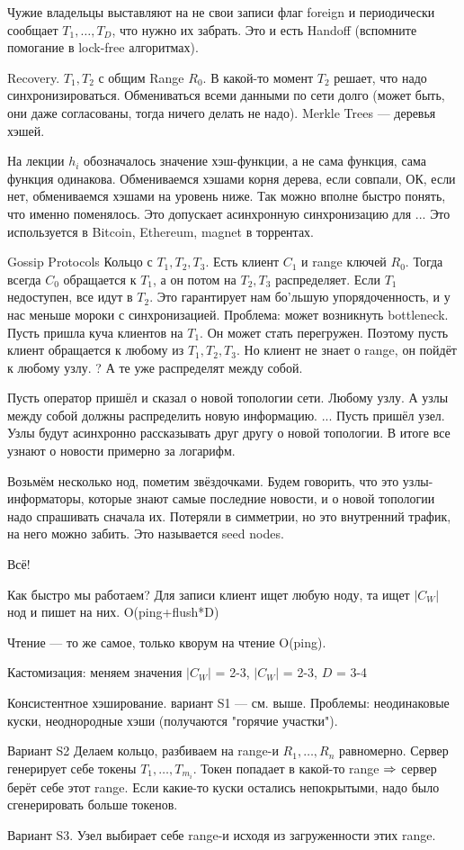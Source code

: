 Чужие владельцы выставляют на не свои записи флаг foreign и периодически сообщает $T_1, \dots, T_D$, что нужно их забрать. Это и есть Handoff (вспомните помогание в lock-free алгоритмах).

Recovery.
$T_1, T_2$ с общим Range $R_0$. В какой-то момент $T_2$ решает, что надо синхронизироваться. Обмениваться всеми данными по сети долго (может быть, они даже согласованы, тогда ничего делать не надо).
Merkle Trees --- деревья хэшей. 

На лекции $h_i$ обозначалось значение хэш-функции, а не сама функция, сама функция одинакова. Обмениваемся хэшами корня дерева, если совпали, ОК, если нет, обмениваемся хэшами на уровень ниже. Так можно вполне быстро понять, что именно поменялось.
Это допускает асинхронную синхронизацию для ...
Это используется в Bitcoin, Ethereum, magnet в торрентах.

Gossip Protocols
Кольцо с $T_1, T_2, T_3$. Есть клиент $C_1$ и range ключей $R_0$. Тогда всегда $C_0$ обращается к $T_1$, а он потом на $T_2, T_3$ распределяет. Если $T_1$ недоступен, все идут в $T_2$. Это гарантирует нам бо'льшую упорядоченность, и у нас меньше мороки с синхронизацией.
Проблема: может возникнуть bottleneck. Пусть пришла куча клиентов на $T_1$. Он может стать перегружен. 
Поэтому пусть клиент обращается к любому из $T_1, T_2, T_3$. Но клиент не знает о range, он пойдёт к любому узлу. 
? А те уже распределят между собой.

Пусть оператор пришёл и сказал о новой топологии сети. Любому узлу. А узлы между собой должны распределить новую информацию.
...
Пусть пришёл узел. 
Узлы будут асинхронно рассказывать друг другу о новой топологии. В итоге все узнают о новости примерно за логарифм.

Возьмём несколько нод, пометим звёздочками. Будем говорить, что это узлы-информаторы, которые знают самые последние новости, и о новой топологии надо спрашивать сначала их. Потеряли в симметрии, но это внутренний трафик, на него можно забить.
Это называется seed nodes. 

Всё!

Как быстро мы работаем?
Для записи клиент ищет любую ноду, та ищет $|C_W|$ нод и пишет на них.
O(ping+flush*D)

Чтение --- то же самое, только кворум на чтение O(ping).

Кастомизация: меняем значения
$|C_W|$ = 2-3, $|C_W|$ = 2-3, $D$ = 3-4

Консистентное хэширование.
вариант S1 --- см. выше.
Проблемы: неодинаковые куски, неоднородные хэши (получаются "горячие участки").

Вариант S2
Делаем кольцо, разбиваем на range-и $R_1, \dots, R_n$ равномерно. Сервер генерирует себе токены $T_1, \dots, T_{m_i}$. Токен попадает в какой-то range $\Rightarrow$ сервер берёт себе этот range. Если какие-то куски остались непокрытыми, надо было сгенерировать больше токенов.

Вариант S3. Узел выбирает себе range-и исходя из загруженности этих range.

